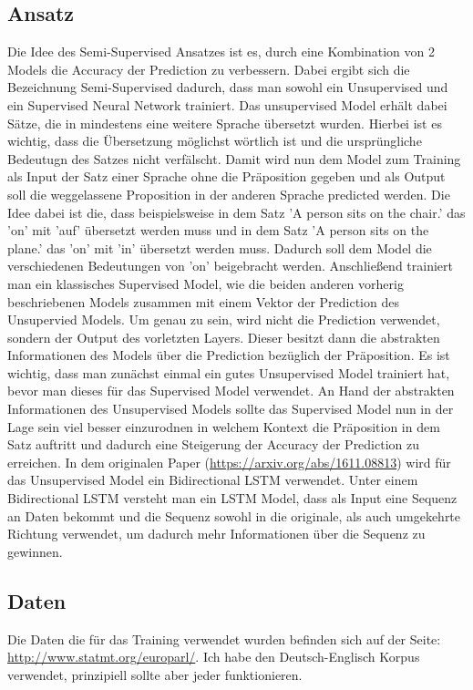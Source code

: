\documentclass[10pt,a4paper]{article}
\begin{document}
\subsection{Ansatz}
\begin{flushleft}
Die Idee des Semi-Supervised Ansatzes ist es, durch eine Kombination von 2 Models die Accuracy der Prediction zu verbessern. Dabei ergibt sich die Bezeichnung Semi-Supervised dadurch, dass man sowohl ein Unsupervised und ein Supervised Neural Network trainiert. Das unsupervised Model erhält dabei Sätze, die in mindestens eine weitere Sprache übersetzt wurden. Hierbei ist es wichtig, dass die Übersetzung möglichst wörtlich ist und die ursprüngliche Bedeutugn des Satzes nicht verfälscht. Damit wird nun dem Model zum Training als Input der Satz einer Sprache ohne die Präposition gegeben und als Output soll die weggelassene Proposition in der anderen Sprache predicted werden. Die Idee dabei ist die, dass beispielsweise in dem Satz 'A person sits on the chair.' das 'on' mit 'auf' übersetzt werden muss und in dem Satz 'A person sits on the plane.' das 'on' mit 'in' übersetzt werden muss. Dadurch soll dem Model die verschiedenen Bedeutungen von 'on' beigebracht werden. Anschließend trainiert man ein klassisches Supervised Model, wie die beiden anderen vorherig beschriebenen Models zusammen mit einem Vektor der Prediction des Unsupervied Models. Um genau zu sein, wird nicht die Prediction verwendet, sondern der Output des vorletzten Layers. Dieser besitzt dann die abstrakten Informationen des Models über die Prediction bezüglich der Präposition. Es ist wichtig, dass man zunächst einmal ein gutes Unsupervised Model trainiert hat, bevor man dieses für das Supervised Model verwendet. An Hand der abstrakten Informationen des Unsupervised Models sollte das Supervised Model nun in der Lage sein viel besser einzurodnen in welchem Kontext die Präposition in dem Satz auftritt und dadurch eine Steigerung der Accuracy der Prediction zu erreichen. In dem originalen Paper (\url{https://arxiv.org/abs/1611.08813}) wird für das Unsupervised Model ein Bidirectional LSTM verwendet. Unter einem Bidirectional LSTM versteht man ein LSTM Model, dass als Input eine Sequenz an Daten bekommt und die Sequenz sowohl in die originale, als auch umgekehrte Richtung verwendet, um dadurch mehr Informationen über die Sequenz zu gewinnen.
\end{flushleft}

\subsection{Daten}
\begin{flushleft}
Die Daten die für das Training verwendet wurden befinden sich auf der Seite: \url{http://www.statmt.org/europarl/}. Ich habe den Deutsch-Englisch Korpus verwendet, prinzipiell sollte aber jeder funktionieren.
\end{flushleft}
\end{document}
